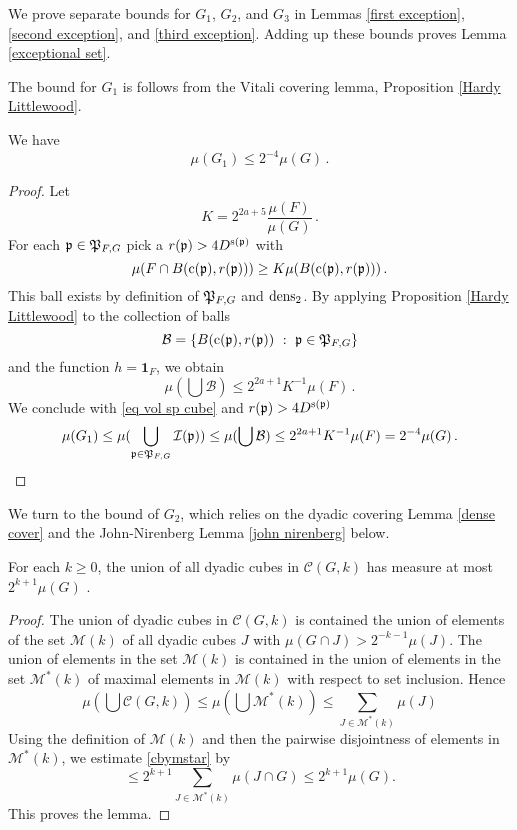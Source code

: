 {We prove separate bounds for $G_1$, $G_2$, and $G_3$
in Lemmas  \ref{first exception},
\ref{second exception}, and \ref{third exception}. Adding up these bounds proves Lemma \ref{exceptional set}.

The bound for $G_1$ is follows from the Vitali covering lemma, Proposition \ref{Hardy Littlewood}.

\begin{lemma}\label{first exception}
We have
\begin{equation}
    \mu(G_1)\le 2^{-4}\mu(G)\, .
\end{equation}
\end{lemma}
\begin{proof}
Let
$$
    K = 2^{2a+5}\frac{\mu(F)}{\mu(G)}\,.
$$
For each $\mathfrak p\in \mathfrak P_{F,G}$ pick a
$r(\mathfrak p)>4D^{\mathrm{s}(\mathfrak p)}$  with
$$
  {\mu(F\cap B(\mathrm{c}(\mathfrak p),r(\mathfrak p)))}\ge K{\mu(B(\mathrm{c}(\mathfrak p),r(\mathfrak p)))}\, .
$$
This ball exists by definition of $\mathfrak P_{F,G}$
and $\operatorname{\operatorname{dens}}_2$. By applying Proposition \ref{Hardy Littlewood} to the collection of balls
$$
    \mathcal{B} = \{B(\mathrm{c}(\mathfrak p),r(\mathfrak p)) \ : \ \mathfrak p \in \mathfrak P_{F,G}\}
$$
and the function $h = \mathbf{1}_F$, we obtain
$$
    \mu(\bigcup \mathcal{B}) \le 2^{2a+1} K^{-1}  \mu(F)\,.
$$
We conclude  with \eqref{eq vol sp cube} and $r(\mathfrak p)>4D^{\mathrm{s}(\mathfrak p)}$
$$
    \mu(G_1)\le \mu(\bigcup_{\mathfrak p\in \mathfrak P_{F,G}} \mathcal{I}(\mathfrak p))
    \le \mu(\bigcup \mathcal{B})\le 2^{2a+1} K^{-1} \mu (F) = 2^{-4}\mu(G)\,.
$$
\end{proof}


We turn to the bound of $G_2$, which relies on the dyadic covering Lemma \ref{dense cover} and the
John-Nirenberg Lemma \ref{john nirenberg} below.

\begin{lemma}\label{dense cover}
For  each $k\ge 0$, the union of all dyadic cubes
in $\mathcal{C}(G,k)$ has measure at most $2^{k+1} \mu(G)$ .
\end{lemma}
\begin{proof}
The union of dyadic cubes  in $\mathcal{C}(G,k)$
is contained the union of elements of the set $\mathcal{M}(k)$
of all dyadic cubes $J$ with
${\mu(G \cap J)} > 2^{-k-1}{\mu(J)}$.
The union of elements in the set $\mathcal{M}(k)$ is contained in the union of elements in
the set $\mathcal{M}^*(k)$ of maximal elements in
$\mathcal{M}(k)$ with respect to set inclusion. Hence
\begin{equation}\label{cbymstar}
\mu (\bigcup \mathcal{C}(G,k))\le \mu (\bigcup \mathcal{M}^*(k))\le
\sum_{J\in \mathcal{M}^*(k)}\mu(J)
\end{equation}
Using the definition of $\mathcal{M}(k)$ and then
the  pairwise disjointness of elements in
$\mathcal{M}^*(k)$,
we estimate \eqref{cbymstar} by
\begin{equation}
\le
2^{k+1}\sum_{J\in \mathcal{M}^*(k)}\mu(J\cap G)
\le 2^{k+1}\mu(G).
\end{equation}
This proves the lemma.
\end{proof}




}
